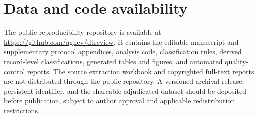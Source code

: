\section{Data and code availability}

The public reproducibility repository is available at \url{https://github.com/aghcv/dtreview}. It contains the editable manuscript and supplementary protocol appendices, analysis code, classification rules, derived record-level classifications, generated tables and figures, and automated quality-control reports. The source extraction workbook and copyrighted full-text reports are not distributed through the public repository. A versioned archival release, persistent identifier, and the shareable adjudicated dataset should be deposited before publication, subject to author approval and applicable redistribution restrictions.
